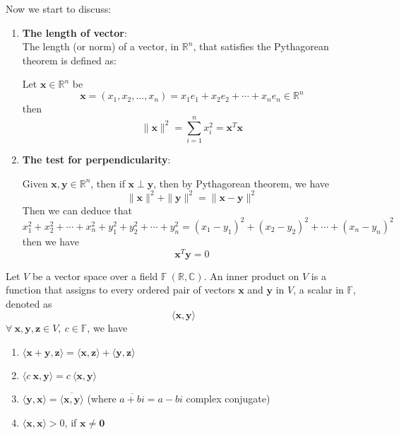 Now we start to discuss:
\begin{enumerate}[label=(\roman*)]
    \item \textbf{The length of vector}:\\
    The length (or norm) of a vector, in $\mathbb{R}^n$, that satisfies the Pythagorean theorem is defined as:
    \begin{definition}
        Let $\mathbf{x} \in \mathbb{R}^n$ be
        \[
            \mathbf{x} = (x_1, x_2, \ldots, x_n) = x_1 e_1 + x_2 e_2 + \cdots + x_n e_n \in \mathbb{R}^n 
        \]
        then
        \[
            \|\mathbf{x}\|^2 = \sum_{i=1}^n x_i^2 = \mathbf{x}^T \mathbf{x}
        \] 
    \end{definition}

    \item \textbf{The test for perpendicularity}:\\
    \begin{definition}
        Given $\mathbf{x}, \mathbf{y} \in \mathbb{R}^n$, then if $\mathbf{x} \perp \mathbf{y}$, then by Pythagorean theorem, we have
        \[
            \|\mathbf{x}\|^2 + \|\mathbf{y}\|^2 = \|\mathbf{x} - \mathbf{y}\|^2
        \]
        Then we can deduce that 
        \[
            x_1^2 + x_2^2 + \cdots + x_n^2 + y_1^2 + y_2^2 + \cdots + y_n^2 = (x_1 - y_1)^2 + (x_2 - y_2)^2 + \cdots + (x_n - y_n)^2
        \]
        then we have
        \[
            \mathbf{x}^T \mathbf{y} = 0
        \]
    \end{definition}
\end{enumerate}

\newpage

\begin{definition}
    Let $V$ be a vector space over a field $\mathbb{F}\ (\mathbb{R}, \mathbb{C})$. An inner product on $V$ is a function that assigns to every ordered pair of vectors $\mathbf{x}$ and $\mathbf{y}$ in $V$, a scalar in $\mathbb{F}$, denoted as 
    \[
        \langle \mathbf{x}, \mathbf{y} \rangle
    \]
    \( \forall\ \mathbf{x}, \mathbf{y}, \mathbf{z} \in V, \ c \in \mathbb{F} \), we have
    \begin{enumerate}[label=(\alph*)]
        \item $\langle \mathbf{x} + \mathbf{y}, \mathbf{z} \rangle = \langle \mathbf{x}, \mathbf{z} \rangle + \langle \mathbf{y}, \mathbf{z} \rangle$
        \item $\langle c\ \mathbf{x}, \mathbf{y} \rangle = c\ \langle \mathbf{x}, \mathbf{y} \rangle$
        \item $\langle \mathbf{y}, \mathbf{x} \rangle = \overline{\langle \mathbf{x}, \mathbf{y} \rangle}$ (where $\overline{a + bi} = a - bi$ complex conjugate)
        \item $\langle \mathbf{x}, \mathbf{x} \rangle > 0$, if $\mathbf{x} \neq \mathbf{0}$
    \end{enumerate}
\end{definition}

